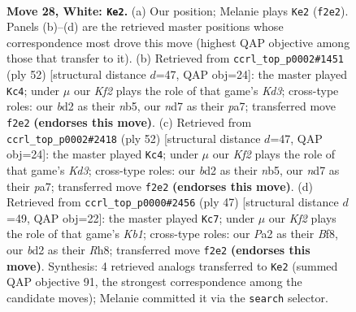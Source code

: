 \documentclass[11pt]{article}
\begin{document}
\clearpage

\begin{figure}[p]\centering
\begin{subfigure}{0.46\textwidth}\centering
\resizebox{\linewidth}{!}{%
\newchessgame
\chessboard[
  setfen={r1k3nN/3n4/8/pp2pbp1/7p/5P1P/P2b1KP1/7R w - - 2 28},
  showmover=false,
  pgfstyle=straightmove, color=movearrow, markmove={f2-e2}
]}
\caption{}
\end{subfigure}\hfill
\begin{subfigure}{0.46\textwidth}\centering
\resizebox{\linewidth}{!}{%
\newchessgame
\chessboard[
  setfen={1k5r/pp3p1p/2p5/Pnb2N2/5P2/3KP3/5PBP/R7 w - - 5 27},
  showmover=false,
  pgfstyle=straightmove, color=movearrow, markmove={d3-c4}
]}
\caption{}
\end{subfigure}
\\[4pt]
\begin{subfigure}{0.46\textwidth}\centering
\resizebox{\linewidth}{!}{%
\newchessgame
\chessboard[
  setfen={1k5r/pp3p1p/2p5/Pnb2N2/5P2/3KP3/5PBP/R7 w - - 4 27},
  showmover=false,
  pgfstyle=straightmove, color=movearrow, markmove={d3-c4}
]}
\caption{}
\end{subfigure}\hfill
\begin{subfigure}{0.46\textwidth}\centering
\resizebox{\linewidth}{!}{%
\newchessgame
\chessboard[
  setfen={1k3b1r/pp3p1p/2p5/P4N2/4BP2/4P3/1n2KP1P/7R b - - 0 24},
  showmover=false,
  pgfstyle=straightmove, color=movearrow, markmove={b8-c7}
]}
\caption{}
\end{subfigure}
\caption{\textbf{Move 28, White: \texttt{Ke2}.} (a) Our position; Melanie plays \texttt{Ke2} (\texttt{f2e2}). Panels (b)--(d) are the retrieved master positions whose correspondence most drove this move (highest QAP objective among those that transfer to it). (b) Retrieved from \texttt{ccrl\_top\_p0002\#1451} (ply 52) [structural distance $d$=47, QAP obj=24]: the master played \texttt{Kc4}; under $\mu$ our \emph{Kf2} plays the role of that game's \emph{Kd3}; cross-type roles: our \emph{b}d2 as their \emph{n}b5, our \emph{n}d7 as their \emph{p}a7; transferred move \texttt{f2e2} \textbf{(endorses this move)}. (c) Retrieved from \texttt{ccrl\_top\_p0002\#2418} (ply 52) [structural distance $d$=47, QAP obj=24]: the master played \texttt{Kc4}; under $\mu$ our \emph{Kf2} plays the role of that game's \emph{Kd3}; cross-type roles: our \emph{b}d2 as their \emph{n}b5, our \emph{n}d7 as their \emph{p}a7; transferred move \texttt{f2e2} \textbf{(endorses this move)}. (d) Retrieved from \texttt{ccrl\_top\_p0000\#2456} (ply 47) [structural distance $d$=49, QAP obj=22]: the master played \texttt{Kc7}; under $\mu$ our \emph{Kf2} plays the role of that game's \emph{Kb1}; cross-type roles: our \emph{P}a2 as their \emph{B}f8, our \emph{b}d2 as their \emph{R}h8; transferred move \texttt{f2e2} \textbf{(endorses this move)}. Synthesis: 4 retrieved analogs transferred to \texttt{Ke2} (summed QAP objective 91, the strongest correspondence among the candidate moves); Melanie committed it via the \texttt{search} selector.}
\label{fig:thought-m54}
\end{figure}
\end{document}
